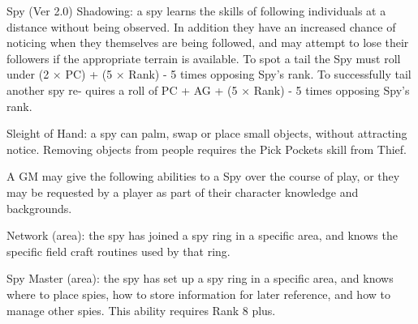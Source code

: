 \begin{Chapter}{Spy (Ver 2.0)}
Shadowing:  a  spy  learns  the  skills  of  following 
individuals at a distance without being observed. In 
addition they have an increased chance of noticing 
when they themselves are being followed, and may 
attempt  to  lose  their  followers  if  the  appropriate 
terrain is available. To spot a tail the Spy must roll 
under  (2  ×  PC)  +  (5  ×  Rank)  -  5  times  opposing 
Spy’s  rank.  To  successfully  tail  another  spy  re-
quires  a  roll  of  PC  +  AG  +  (5  ×  Rank)  -  5  times 
opposing Spy’s rank. 

Sleight  of  Hand:  a  spy  can  palm,  swap  or  place 
small  objects,  without attracting  notice.  Removing 
objects from people requires the Pick Pockets skill 
from Thief. 

A  GM  may  give  the  following  abilities  to  a  Spy 
over  the  course  of  play,  or  they  may  be  requested 
by  a  player  as  part  of  their  character  knowledge 
and backgrounds. 

Network (area): the spy has joined a spy ring in a 
specific  area,  and  knows  the  specific  field  craft 
routines used by that ring. 

Spy Master (area): the spy has set up a spy ring in 
a  specific  area,  and  knows  where  to  place  spies, 
how  to  store  information  for  later  reference,  and 
how  to  manage  other  spies.  This  ability  requires 
Rank 8 plus. 

\end{Chapter}
